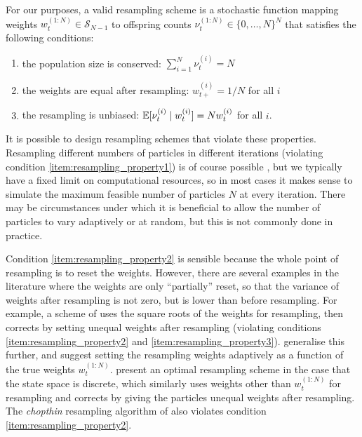 \begin{defn}\label{defn:resampling}
For our purposes, a valid resampling scheme is a stochastic function mapping weights 
$w_t^{(1:N)} \in \mathcal{S}_{N-1}$ 
to offspring counts 
$\nu_t^{(1:N)} \in \{0,\dots,N\}^N $
that satisfies the following conditions:
\begin{enumerate}
\item\label{item:resampling_property1} the population size is conserved:
$ \sum_{i=1}^N \nu_t^{(i)} =N $
\item\label{item:resampling_property2} the weights are equal after resampling:
$w_{t+}^{(i)} = 1/N$ for all $i$
\item\label{item:resampling_property3} the resampling is unbiased:
$ \mathbb{E}[ \nu_t^{(i)} \mid w_t^{(i)} ] = N w_t^{(i)} $ for all $i$.
\end{enumerate}
\end{defn}
It is possible to design resampling schemes that violate these properties.
Resampling different numbers of particles in different iterations (violating condition \ref{item:resampling_property1}) is of course possible \parencite[see for example][]{crisan1998}, but we typically have a fixed limit on computational resources, so in most cases it makes sense to simulate the maximum feasible number of particles $N$ at every iteration.
There may be circumstances under which it is beneficial to allow the number of particles to vary adaptively \parencite{fox2003,chau2012,lee2018} or at random, but this is not commonly done in practice.

Condition \ref{item:resampling_property2} is sensible because the whole point of resampling is to reset the weights. However, there are several examples in the literature where the weights are only ``partially'' reset, so that the variance of weights after resampling is not zero, but is lower than before resampling.
For example, a scheme of \textcite{liu1998} uses the square roots of the weights for resampling, then corrects by setting unequal weights after resampling (violating conditions \ref{item:resampling_property2} and \ref{item:resampling_property3}).
\textcite[Section 3.1]{liu2001} generalise this further, and suggest setting the resampling weights adaptively as a function of the true weights $w_t^{(1:N)}$.
\textcite{fearnhead2003} present an optimal resampling scheme in the case that the state space is discrete, which similarly uses weights other than $w_t^{(1:N)}$ for resampling and corrects by giving the particles unequal weights after resampling.
The \emph{chopthin} resampling algorithm of \textcite{gandy2016} also violates condition \ref{item:resampling_property2}.

